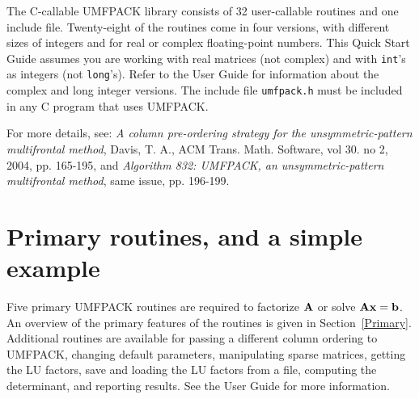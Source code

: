 \documentclass[11pt]{article}
\newcommand{\m}[1]{{\bf{#1}}}       %
\begin{document}

The C-callable UMFPACK library consists of 32 user-callable routines and one
include file.  Twenty-eight of the routines come in four versions, with
different sizes of integers and for real or complex floating-point numbers.
This Quick Start Guide assumes you are working with real matrices
(not complex) and with {\tt int}'s as integers (not {\tt long}'s).
Refer to the User Guide for information about the complex and
long integer versions.  The include file {\tt umfpack.h}
must be included in any C program that uses UMFPACK.

For more details, see:
{\em A column pre-ordering strategy for the unsymmetric-pattern multifrontal method},
Davis, T. A.,
ACM Trans. Math. Software, vol 30. no 2, 2004, pp. 165-195, and
{\em Algorithm 832:  {UMFPACK}, an unsymmetric-pattern multifrontal method},
same issue, pp. 196-199.

\section{Primary routines, and a simple example}

Five primary UMFPACK routines are required to factorize $\m{A}$ or
solve $\m{Ax}=\m{b}$.  An overview of the primary features of the routines
is given in Section~\ref{Primary}.
Additional routines are available for passing a different column ordering
to UMFPACK, changing default parameters, manipulating sparse matrices,
getting the LU factors, save and loading the LU factors from a file,
computing the determinant,
and reporting results.  See the User Guide for more information.
\end{document}
